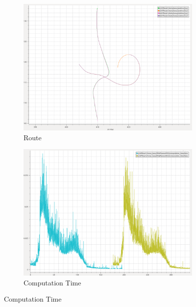         \begin{figure}[H]
        \centering
        
            \begin{subfigure}[b]{0.45\textwidth}
                \centering
                \includegraphics[width=\textwidth]{figs/Chap5/plot_cl_w_vs_wo.png}
                \caption{Route}
                \label{fig:plot_cl_w_vs_wo}
            \end{subfigure}
            \begin{subfigure}[b]{0.45\textwidth}
                \centering
                \includegraphics[width=\textwidth]{figs/Chap5/plot_cl_w_vs_wo_CT.png}
                \caption{Computation Time}
                \label{fig:plot_cl_w_vs_wo_CT}
            \end{subfigure}
            

\end{figure}
